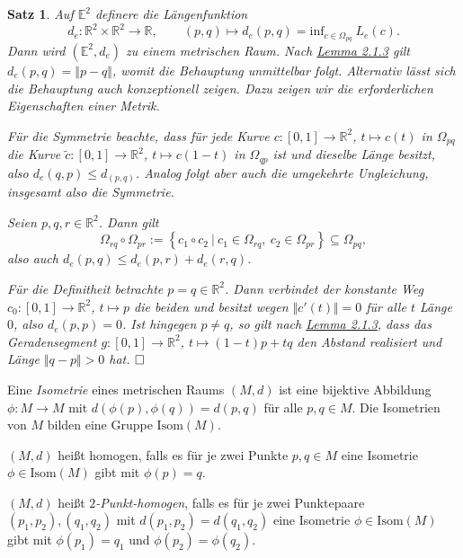 \documentclass[11pt]{book}
\numberwithin{dummy}{section}
\newtheorem{theorem}{Satz}[section]
\theoremstyle{nonumberbreak}
\newenvironment{defin}[1][]{\ifthenelse{\equal{#1}{}}{\definition}{\definition[#1]}\rm}{\enddefinition}
\newenvironment{pr}[1][]{\ifthenelse{\equal{#1}{}}{\proof}{\proof[#1]}\rm}{\endproof}
\newcommand{\R}{\mathbb{R}}
\newcommand{\la}{\longrightarrow}
\begin{document}
\begin{spacing}{1.4}
\begin{theorem}
Auf $\mathbb{E}^2$ definere die Längenfunktion
$$d_e: \mathbb{R}^2 \times \R^2 \la \R, \qquad (p,q) \mapsto d_e(p,q) = \mathrm{inf}_{c \in \Omega_{pq}} \ L_e(c).$$
Dann wird $(\mathbb{E}^2, d_e)$ zu einem metrischen Raum.
\begin{pr}
Nach \hyperlink{lemmazweieinsdrei}{Lemma 2.1.3} gilt $d_e(p,q) = \Vert p-q \Vert$, womit die Behauptung unmittelbar folgt. Alternativ lässt sich die Behauptung auch konzeptionell zeigen. Dazu zeigen wir die erforderlichen Eigenschaften einer Metrik.
\begin{compactenum}
\item Für die Symmetrie beachte, dass für jede Kurve $c:[0,1] \la \R^2$, $t \mapsto c(t)$ in $\Omega_{pq}$ die Kurve $\tilde{c}: [0,1] \la \R^2$, $t \mapsto c(1-t)$ in $\Omega_{qp}$ ist und dieselbe Länge besitzt, also $d_e(q,p) \leqslant d_(p,q)$. Analog folgt aber auch die umgekehrte Ungleichung, insgesamt also die Symmetrie.
\item  Seien $p,q,r \in \R^2$. Dann gilt
$$\Omega_{rq} \circ \Omega_{pr} := \left\{ c_1 \circ c_2 \ \vert \ c_1 \in \Omega_{rq}, \ c_2 \in \Omega_{pr} \right\} \subseteq \Omega_{pq},$$
also auch $d_e(p,q) \leqslant d_e(p,r) + d_e(r,q)$.
\item Für die Definitheit betrachte $p=q \in \R^2$. Dann verbindet der konstante Weg $c_0: [0,1] \la \R^2$, $t \mapsto p$ die beiden und besitzt wegen $\Vert c'(t) \Vert = 0$ für alle $t$ Länge $0$, also $d_e(p,p)=0$. Ist hingegen $p \neq q$, so gilt nach \hyperlink{lemmazweieinsdrei}{Lemma 2.1.3}, dass das Geradensegment $g: [0,1] \la \R^2$, $t \mapsto (1-t)p + tq$ den Abstand realisiert und Länge $\Vert q-p \Vert > 0$ hat. $\hfill \Box$
\end{compactenum}
\end{pr}

\end{theorem}

\begin{defin}
\begin{compactenum}
\item Eine \textit{Isometrie} eines metrischen Raums $(M,d)$ ist eine bijektive Abbildung $\phi: M \la M$ mit $d(\phi(p), \phi(q)) = d(p,q)$ für alle $p,q \in M$. Die Isometrien von $M$ bilden eine Gruppe $\mathrm{Isom}(M)$. 
\item $(M,d)$ heißt homogen, falls es für je zwei Punkte $p,q \in M$ eine Isometrie $\phi \in \mathrm{Isom}(M)$ gibt mit $\phi(p) = q$. 
\item $(M,d)$ heißt $2$\textit{-Punkt-homogen}, falls es für je zwei Punktepaare $(p_1,p_2), (q_1,q_2)$ mit $d(p_1, p_2) = d(q_1, q_2)$ eine Isometrie $\phi \in \mathrm{Isom}(M)$ gibt mit $\phi(p_1) =q_1$ und $\phi(p_2) = \phi(q_2)$. 
\end{compactenum}
\end{defin}



\end{spacing}
\end{document}
